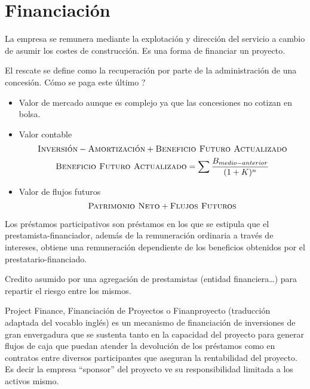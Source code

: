 \section{Financiación} %
\label{sec:financiación}

\begin{mydef}[Concesión]
    La empresa se remunera mediante la explotación y dirección del servicio a cambio de asumir los costes de construcción. Es una forma de financiar un proyecto.
\end{mydef}

\begin{myrem}
    El rescate se define como la recuperación por parte de la administración de una concesión. Cómo se paga este último ?
    \begin{itemize}
        \item Valor de mercado aunque es complejo ya que las concesiones no cotizan en bolsa.
        \item Valor contable
        \[
            \textsc{Inversión} - \textsc{Amortización} + \textsc{Beneficio Futuro Actualizado}
        \]
        \[
            \textsc{Beneficio Futuro Actualizado} = \sum\frac{B_{medio-anterior}}{(1+K)^n}
        \]
        \item Valor de flujos futuros
        \[
            \textsc{Patrimonio Neto} + \textsc{Flujos Futuros}
        \]
    \end{itemize}
\end{myrem}

\begin{mydef}
     Los préstamos participativos son préstamos en los que se estipula que el prestamista-financiador, además de la remuneración ordinaria a través de intereses, obtiene una remuneración dependiente de los beneficios obtenidos por el prestatario-financiado.
\end{mydef}

\begin{mydef}
    Credito asumido por una agregación de prestamistas (entidad financiera…) para repartir el riesgo entre los mismos.
\end{mydef}

\begin{mydef}
    Project Finance, Financiación de Proyectos o Finanproyecto (traducción adaptada del vocablo inglés) es un mecanismo de financiación de inversiones de gran envergadura que se sustenta tanto en la capacidad del proyecto para generar flujos de caja que puedan atender la devolución de los préstamos como en contratos entre diversos participantes que aseguran la rentabilidad del proyecto. Es decir la empresa ``sponsor'' del proyecto ve su responsibilidad limitada a los activos mismo.
\end{mydef}

